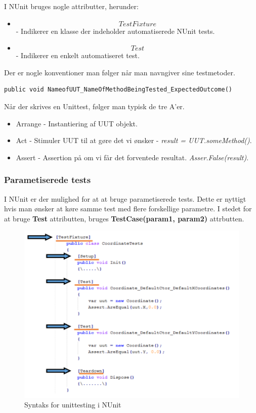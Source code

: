 I NUnit bruges nogle attributter, herunder:

\begin{itemize}
	\item \[TestFixture\] - Indikerer en klasse der indeholder automatiserede NUnit tests. 
	\item \[Test\] - Indikerer en enkelt automatiseret test.
\end{itemize}

Der er nogle konventioner man følger når man navngiver sine testmetoder.

\begin{lstlisting}
public void NameofUUT_NameOfMethodBeingTested_ExpectedOutcome()
\end{lstlisting}

Når der skrives en Unittest, følger man typisk de tre A'er.

\begin{itemize}
	\item Arrange - Instantiering af UUT objekt.
	\item Act - Stimuler UUT til at gøre det vi ønsker - \textit{result = UUT.someMethod()}.
	\item Assert - Assertion på om vi får det forventede resultat. \textit{Asser.False(result)}.
\end{itemize}

\subsubsection{Parametiserede tests}
I NUnit er der mulighed for at at bruge parametiserede tests. Dette er nyttigt hvis man ønsker at køre samme test med flere forskellige parametre. I stedet for at bruge \textbf{Test} attributten, bruges \textbf{TestCase(param1, param2)} attrbutten.

\begin{figure}
\centering
\includegraphics[width=0.7\linewidth]{figs/testFixture.PNG}
\caption{Syntaks for unittesting i NUnit}
\label{fig:testFixture}
\end{figure}

